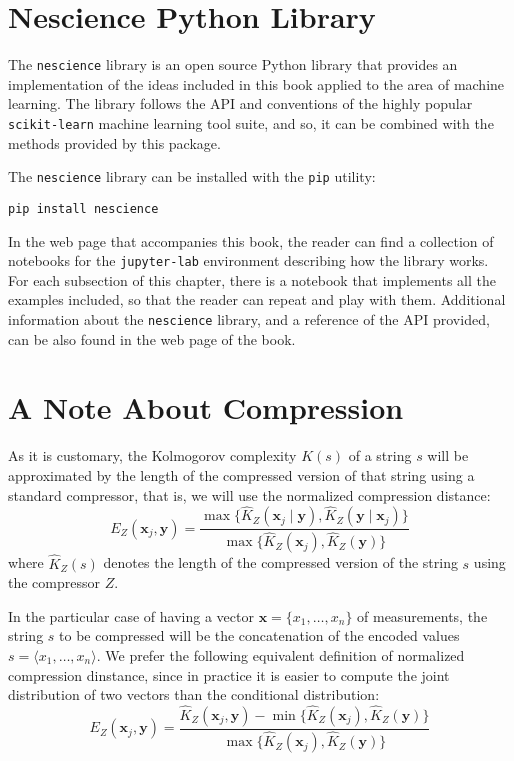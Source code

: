 %
%

\section{Nescience Python Library}
\label{sec:nescience_library}

The \texttt{nescience} library is an open source Python library that provides an implementation of the ideas included in this book applied to the area of machine learning. The library follows the API and conventions of the highly popular \texttt{scikit-learn} machine learning tool suite, and so, it can be combined with the methods provided by this package.

The \texttt{nescience} library can be installed with the \texttt{pip} utility:

\begin{sourcecode}
{\scriptsize \begin{verbatim}
pip install nescience
\end{verbatim}}
\end{sourcecode}

In the web page that accompanies this book, the reader can find a collection of notebooks for the \texttt{jupyter-lab} environment describing how the library works. For each subsection of this chapter, there is a notebook that implements all the examples included, so that the reader can repeat and play with them. Additional information about the \texttt{nescience} library, and a reference of the API provided, can be also found in the web page of the book.

%
%

\section{A Note About Compression}
\label{sec:note_about_compression}

As it is customary, the Kolmogorov complexity $K(s)$ of a string $s$ will be approximated by the length of the compressed version of that string using a standard compressor, that is, we will use the normalized compression distance:
\[
E_Z(\mathbf{x}_j, \mathbf{y}) = \frac{\max\{ \hat{K}_Z(\mathbf{x}_j \mid \mathbf{y}), \hat{K}_Z(\mathbf{y} \mid \mathbf{x}_j) \}}{\max \{ \hat{K}_Z(\mathbf{x}_j), \hat{K}_Z(\mathbf{y}) \} }
\]
where $\hat{K}_Z(s)$ denotes the length of the compressed version of the string $s$ using the compressor $Z$.

In the particular case of having a vector $\mathbf{x} = \{ x_1, \ldots, x_n \}$ of measurements, the string $s$ to be compressed will be the concatenation of the encoded values $s = \langle x_1, \ldots, x_n \rangle$. We prefer the following equivalent definition of normalized compression dinstance, since in practice it is easier to compute the joint distribution of two vectors than the conditional distribution:
\[
E_Z(\mathbf{x}_j, \mathbf{y}) = \frac{ \hat{K}_Z(\mathbf{x}_j, \mathbf{y}) - \min\{ \hat{K}_Z(\mathbf{x}_j), \hat{K}_Z(\mathbf{y}) \} } { \max\{ \hat{K}_Z(\mathbf{x}_j), \hat{K}_Z(\mathbf{y}) \} }
\]

